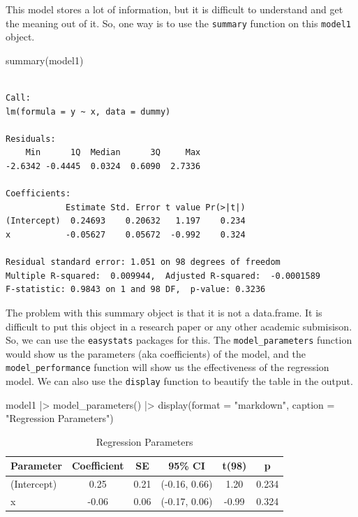 \documentclass[
  letterpaper,
  paper =a4,
  twoside,
  openright,
  headsepline,
  footsepline,
  listof = totocnumbered,
  chapterprefix = true,
  firstiscover,
  parskip = full*]{scrbook}
\newenvironment{Shaded}{\begin{snugshade}}{\end{snugshade}}
\newcommand{\AttributeTok}[1]{\textcolor[rgb]{0.40,0.45,0.13}{#1}}
\newcommand{\FunctionTok}[1]{\textcolor[rgb]{0.28,0.35,0.67}{#1}}
\newcommand{\NormalTok}[1]{\textcolor[rgb]{0.00,0.23,0.31}{#1}}
\newcommand{\SpecialCharTok}[1]{\textcolor[rgb]{0.37,0.37,0.37}{#1}}
\newcommand{\StringTok}[1]{\textcolor[rgb]{0.13,0.47,0.30}{#1}}
\begin{document}
This model stores a lot of information, but it is difficult to
understand and get the meaning out of it. So, one way is to use the
\texttt{summary} function on this \texttt{model1} object.

\begin{Shaded}
\begin{Highlighting}[]
\FunctionTok{summary}\NormalTok{(model1)}
\end{Highlighting}
\end{Shaded}

\begin{verbatim}

Call:
lm(formula = y ~ x, data = dummy)

Residuals:
    Min      1Q  Median      3Q     Max 
-2.6342 -0.4445  0.0324  0.6090  2.7336 

Coefficients:
            Estimate Std. Error t value Pr(>|t|)
(Intercept)  0.24693    0.20632   1.197    0.234
x           -0.05627    0.05672  -0.992    0.324

Residual standard error: 1.051 on 98 degrees of freedom
Multiple R-squared:  0.009944,  Adjusted R-squared:  -0.0001589 
F-statistic: 0.9843 on 1 and 98 DF,  p-value: 0.3236
\end{verbatim}

The problem with this summary object is that it is not a data.frame. It
is difficult to put this object in a research paper or any other
academic submisison. So, we can use the \texttt{easystats} packages for
this. The \texttt{model\_parameters} function would show us the
parameters (aka coefficients) of the model, and the
\texttt{model\_performance} function will show us the effectiveness of
the regression model. We can also use the \texttt{display} function to
beautify the table in the output.

\begin{Shaded}
\begin{Highlighting}[]
\NormalTok{model1 }\SpecialCharTok{|\textgreater{}} \FunctionTok{model\_parameters}\NormalTok{() }\SpecialCharTok{|\textgreater{}} 
  \FunctionTok{display}\NormalTok{(}\AttributeTok{format =} \StringTok{"markdown"}\NormalTok{, }\AttributeTok{caption =} \StringTok{"Regression Parameters"}\NormalTok{)}
\end{Highlighting}
\end{Shaded}

\begin{longtable}[]{@{}lccccc@{}}

\caption{\label{tbl-regression-params}Regression Parameters}

\tabularnewline

\toprule\noalign{}
Parameter & Coefficient & SE & 95\% CI & t(98) & p \\
\midrule\noalign{}
\endhead
\bottomrule\noalign{}
\endlastfoot
(Intercept) & 0.25 & 0.21 & (-0.16, 0.66) & 1.20 & 0.234 \\
x & -0.06 & 0.06 & (-0.17, 0.06) & -0.99 & 0.324 \\

\end{longtable}
\end{document}

